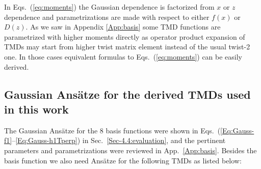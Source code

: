 \documentclass[a4paper,11pt]{article}
\begin{document}
In Eqs.~(\ref{eq:moments}) the Gaussian dependence is factorized 
from $x$ or $z$ dependence and parametrizations are made with 
respect to either $f(x)$ or $D(z)$. As we saw in Appendix 
\ref{App:basis} some TMD functions are parametrized with higher 
moments directly as operator product expansion of TMDs may start 
from higher twist matrix element instead of the usual twist-2 one. 
In those cases equivalent formulas to Eqs.~(\ref{eq:moments}) can 
be easily derived.

\newpage
\subsection{Gaussian Ans\"atze for the derived TMDs used in this work}
\label{App-B:Gauss-Ansatz-non-basis-TMDs}

The Gaussian Ans\"atze for the 8 basis functions were shown 
in Eqs.~(\ref{Eq:Gauss-f1}--\ref{Eq:Gauss-h1Tperp}) in 
Sec.~\ref{Sec-4.4:evaluation}, and the pertinent parameters
and parametrizations were reviewed in App.~\ref{App:basis}.
Besides the basis function we also need Ans\"atze for the 
following TMDs as listed below:
\end{document}

